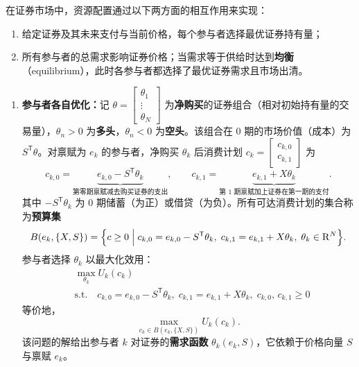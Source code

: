 \begin{tcolorbox}[knowledge,title=2.5 市场均衡]
在证券市场中，资源配置通过以下两方面的相互作用来实现：
\begin{enumerate}
    \item 给定证券及其未来支付与当前价格，每个参与者选择最优证券持有量；
    \item 所有参与者的总需求影响证券价格；当需求等于供给时达到\textbf{均衡}（equilibrium），此时各参与者都选择了最优证券需求且市场出清。
\end{enumerate}

\tcbline

\begin{enumerate}
    \item \textbf{参与者各自优化：}记 $\theta=\begin{bmatrix}\theta_1 \\ \vdots \\ \theta_N\end{bmatrix}$ 为\textbf{净购买}的证券组合（相对初始持有量的交易量），$\theta_n>0$ 为\textbf{多头}，$\theta_n<0$ 为\textbf{空头}。该组合在 0 期的市场价值（成本）为 $S^{\mathsf T}\theta$。对禀赋为 $e_k$ 的参与者，净购买 $\theta_k$ 后消费计划 $c_k=\begin{bmatrix}c_{k,0} \\ c_{k,1}\end{bmatrix}$ 为
    \[
        c_{k,0}=\underbrace{e_{k,0}-S^{\mathsf T}\theta_k}_{\text{第零期禀赋减去购买证券的支出}},\qquad
        c_{k,1}=\underbrace{e_{k,1}+X\theta_k}_{\text{第 1 期禀赋加上证券在第一期的支付}}.
    \]
    其中 $-S^{\mathsf T}\theta_k$ 为 0 期储蓄（为正）或借贷（为负）。所有可达消费计划的集合称为\textbf{预算集}
    \[
        B(e_k,\{X,S\})=\Bigl\{c\ge 0\;\Big|\;
        c_{k,0}=e_{k,0}-S^{\mathsf T}\theta_k,\;
        c_{k,1}=e_{k,1}+X\theta_k,\;
        \theta_k\in\mathrm{R}^{N}\Bigr\}.
    \]
    参与者选择 $\theta_k$ 以最大化效用：
    \[
    \begin{aligned}
        &\max_{\theta_k} U_k(c_k) \\
        &\text{s.t.}\quad
        c_{k,0}=e_{k,0}-S^{\mathsf T}\theta_k,\;
        c_{k,1}=e_{k,1}+X\theta_k,\;
        c_{k,0},\,c_{k,1}\ge 0
    \end{aligned}
    \]
    等价地，
    \[
        \max_{c_k\in B(e_k,\{X,S\})} U_k(c_k).
    \]
    该问题的解给出参与者 $k$ 对证券的\textbf{需求函数} $\theta_k(e_k,S)$，它依赖于价格向量 $S$ 与禀赋 $e_k$。


\end{enumerate}
\end{tcolorbox}
